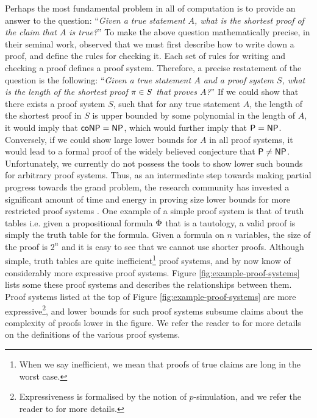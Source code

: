 \documentclass[11pt]{article}
\begin{document}
Perhaps the most fundamental problem in all of computation is to provide an answer to the question: ``\textit{Given a true statement $A$, what is the shortest proof of the claim that $A$ is true?}''
To make the above question mathematically precise, in their seminal work, \citet{cook1979relative} observed that we must first describe how to write down a proof, and define the rules for checking it.
Each set of rules for writing and checking a proof defines a proof system.
Therefore, a precise restatement of the question is the following:  ``\textit{Given a true statement $A$ and a proof system $S$, what is the length of the shortest proof $\pi \in S$ that proves $A$?}''
If we could show that there exists a proof system $S$, such that for any true statement $A$, the length of the shortest proof in $S$ is upper bounded by some polynomial in the length of $A$, it would imply that $\mathsf{coNP} = \mathsf{NP}$, which would further imply that $\mathsf{P} = \mathsf{NP}$.
Conversely, if we could show large lower bounds for $A$ in all proof systems, it would lead to a formal proof of the widely believed conjecture that $\mathsf{P} \neq \mathsf{NP}$.
Unfortunately, we currently do not possess the tools to show lower such bounds for arbitrary proof systems.
Thus, as an intermediate step towards making partial progress towards the grand problem, the research community has invested a significant amount of time and energy in proving size lower bounds for more restricted proof systems \citep{blake1937canonical,razborov1998lower, impagliazzo1999lower, alekhnovich2001lower, buss1999linear}.
One example of a simple proof system is that of truth tables i.e. given a propositional formula $\Phi$ that is a tautology, a valid proof is simply the truth table for the formula.
Given a formula on $n$ variables, the size of the proof is $2^n$ and it is easy to see that we cannot use shorter proofs.
Although simple, truth tables are quite inefficient\footnote{When we say inefficient, we mean that proofs of true claims are long in the worst case.} proof systems, and by now know of considerably more expressive proof systems.
Figure \ref{fig:example-proof-systems} lists some these proof systems and describes the relationships between them.
Proof systems listed at the top of Figure \ref{fig:example-proof-systems} are more expressive\footnote{Expressiveness is formalised by the notion of $p$-simulation, and we refer the reader to \citep[Definition 1.6]{ProofComplexityLecNotes} for more details.}, and lower bounds for such proof systems subsume claims about the complexity of proofs lower in the figure.
We refer the reader to \citep{krajicek2019proof, ProofComplexityLecNotesPaul} for more details on the definitions of the various proof systems.
\end{document}

